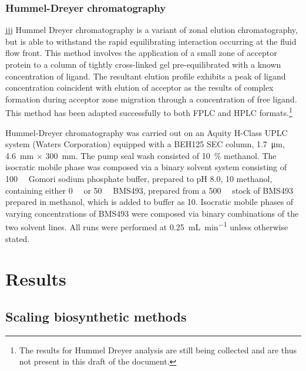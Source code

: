 \begin{refsection}
\subsubsection{Hummel-Dreyer chromatography} jjj Hummel Dreyer chromatography is
a variant of zonal elution chromatography, but is able to withstand the rapid
equilibrating interaction occurring at the fluid flow front. This method
involves the application of a small zone of acceptor protein to a column of
tightly cross-linked gel pre-equilibrated with a known concentration of
ligand.\cite{Hummel1962} The resultant elution profile exhibits a peak of ligand
concentration coincident with elution of acceptor as the results of complex
formation during acceptor zone migration through a concentration of free ligand.
This method has been adapted successfully to both FPLC and HPLC
formats.\cite{Bieri1998}\footnote{The results for Hummel Dreyer analysis are
still being collected and are thus not present in this draft of the document.}

Hummel-Dreyer chromatography was carried out on an Aquity H-Class UPLC system
(Waters Corporation) equipped with a BEH125 SEC column, \SI{1.7}{\um},
\SI{4.6}{\mm} ${\times}$ \SI{300}{\mm}. The pump seal wash consisted of
\SI{10}{\percent} methanol. The isocratic mobile phase was composed via a
binary solvent system consisting of \SI{100}{\milli\moLar} Gomori sodium
phosphate buffer, prepared to pH 8.0, \SI{10}{\volper} methanol, containing
either \SI{0}{\micro\moLar} or \SI{50}{\micro\moLar} BMS493, prepared from a
\SI{500}{\micro\moLar} stock of BMS493 prepared in methanol, which is added to
buffer as \SI{10}{\volper}. Isocratic mobile phases of varying concentrations of
BMS493 were composed via binary combinations of the two solvent lines. All runs
were performed at \SI{0.25}{\mL\per\minute} unless otherwise stated.

\section{Results}

\subsection{Scaling biosynthetic methods}


\end{refsection}
